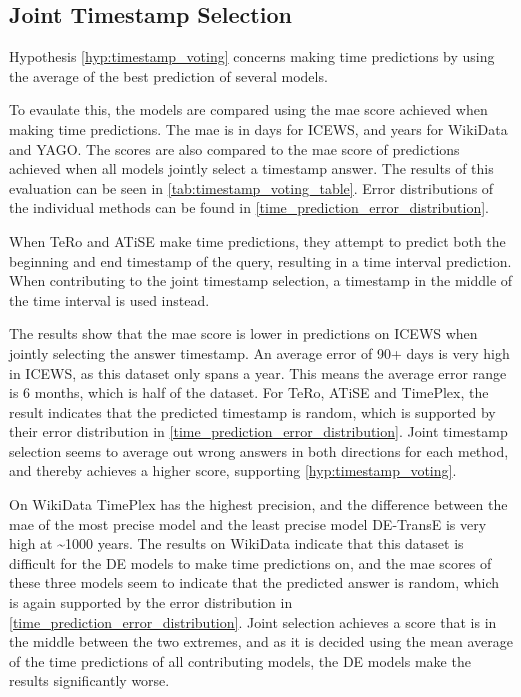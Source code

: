 \subsection{Joint Timestamp Selection}
\label{seubsec:timestamp_voting_experiment}

Hypothesis \autoref{hyp:timestamp_voting} concerns making time predictions by using the average of the best prediction of several models.



To evaulate this, the models are compared using the \gls{mae} score achieved when making time predictions. The \gls{mae} is in days for ICEWS, and years for WikiData and YAGO. The scores are also compared to the \gls{mae} score of predictions achieved when all models jointly select a timestamp answer. The results of this evaluation can be seen in \autoref{tab:timestamp_voting_table}. Error distributions of the individual methods can be found in \autoref{time_prediction_error_distribution}.

When TeRo and ATiSE make time predictions, they attempt to predict both the beginning and end timestamp of the query, resulting in a time interval prediction. When contributing to the joint timestamp selection, a timestamp in the middle of the time interval is used instead.

The results show that the \gls{mae} score is lower in predictions on ICEWS when jointly selecting the answer timestamp.
An average error of 90+ days is very high in ICEWS, as this dataset only spans a year. This means the average error range is 6 months, which is half of the dataset.
For TeRo, ATiSE and TimePlex, the result indicates that the predicted timestamp is random, which is supported by their error distribution in \autoref{time_prediction_error_distribution}. Joint timestamp selection seems to average out wrong answers in both directions for each method, and thereby achieves a higher score, supporting \autoref{hyp:timestamp_voting}. 

On WikiData TimePlex has the highest precision, and the difference between the \gls{mae} of the most precise model and the least precise model DE-TransE is very high at \textasciitilde1000 years. The results on WikiData indicate that this dataset is difficult for the DE models to make time predictions on, and the \gls{mae} scores of these three models seem to indicate that the predicted answer is random, which is again supported by the error distribution in \autoref{time_prediction_error_distribution}. Joint selection achieves a score that is in the middle between the two extremes, and as it is decided using the mean average of the time predictions of all contributing models, the DE models make the results significantly worse. 

